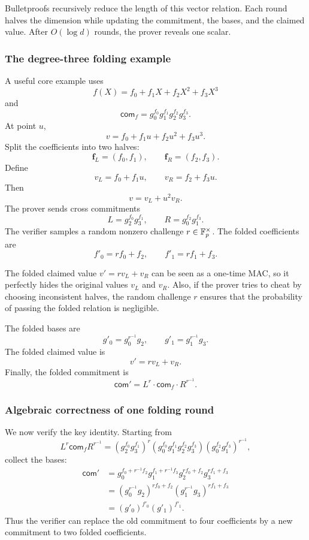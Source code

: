Bulletproofs recursively reduce the length of this vector relation. Each round halves the dimension while updating the commitment, the bases, and the claimed value. After $O(\log d)$ rounds, the prover reveals one scalar.

\subsubsection{The degree-three folding example}

A useful core example uses
\[
    f(X)=f_0+f_1X+f_2X^2+f_3X^3
\]
and
\[
    \mathsf{com}_f=g_0^{f_0}g_1^{f_1}g_2^{f_2}g_3^{f_3}.
\]
At point $u$,
\[
    v=f_0+f_1u+f_2u^2+f_3u^3.
\]
Split the coefficients into two halves:
\[
    \mathbf f_L=(f_0,f_1),
    \qquad
    \mathbf f_R=(f_2,f_3).
\]
Define
\[
    v_L=f_0+f_1u,
    \qquad
    v_R=f_2+f_3u.
\]
Then
\[
    v=v_L+u^2v_R.
\]
The prover sends cross commitments
\[
    L=g_2^{f_0}g_3^{f_1},
    \qquad
    R=g_0^{f_2}g_1^{f_3}.
\]
The verifier samples a random nonzero challenge $r\in\mathbb{F}_p^\times$. The folded coefficients are
\[
    f'_0=rf_0+f_2,
    \qquad
    f'_1=rf_1+f_3.
\]

\begin{intuitionbox}[title=\textbf{Intuition for $r$}]
  The folded claimed value $v' = rv_L + v_R$ can be seen as a one-time MAC, so it perfectly hides the original values $v_L$ and $v_R$. 
  Also, if the prover tries to cheat by choosing inconsistent halves, the random challenge $r$ ensures that the probability of passing the folded relation is negligible.
\end{intuitionbox}

The folded bases are
\[
    g'_0=g_0^{r^{-1}}g_2,
    \qquad
    g'_1=g_1^{r^{-1}}g_3.
\]
The folded claimed value is
\[
    v'=rv_L+v_R.
\]
Finally, the folded commitment is
\[
    \mathsf{com}'=L^r\cdot \mathsf{com}_f\cdot R^{r^{-1}}.
\]

\subsubsection{Algebraic correctness of one folding round}

We now verify the key identity. Starting from
\[
    L^r\mathsf{com}_fR^{r^{-1}}
    =(g_2^{f_0}g_3^{f_1})^r
    (g_0^{f_0}g_1^{f_1}g_2^{f_2}g_3^{f_3})
    (g_0^{f_2}g_1^{f_3})^{r^{-1}},
\]
collect the bases:
\[
\begin{aligned}
\mathsf{com}'
&=g_0^{f_0+r^{-1}f_2}g_1^{f_1+r^{-1}f_3}g_2^{rf_0+f_2}g_3^{rf_1+f_3}\\
&=(g_0^{r^{-1}}g_2)^{rf_0+f_2}(g_1^{r^{-1}}g_3)^{rf_1+f_3}\\
&=(g'_0)^{f'_0}(g'_1)^{f'_1}.
\end{aligned}
\]
Thus the verifier can replace the old commitment to four coefficients by a new commitment to two folded coefficients.

